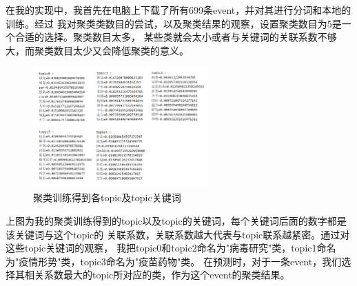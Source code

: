 \documentclass[UTF8]{article}
\begin{document}
在我的实现中，我首先在电脑上下载了所有699条event，并对其进行分词和本地的训练。经过
我对聚类类数目的尝试，以及聚类结果的观察，设置聚类数目为5是一个合适的选择。聚类数目太多，
某些类就会太小或者与关键词的关联系数不够大，而聚类数目太少又会降低聚类的意义。

\begin{figure}[h]
    \label{Ratio}
    \centering
        \includegraphics[width=0.6\textwidth]{cl}
        \caption{聚类训练得到各topic及topic关键词}
    \end{figure}


上图为我的聚类训练得到的topic以及topic的关键词，每个关键词后面的数字都是该关键词与这个topic的
关联系数，关联系数越大代表与topic联系越紧密。通过对这些topic关键词的观察，
我把topic0和topic2命名为"病毒研究"类，topic1命名为"疫情形势"类，topic3命名为"疫苗药物"类。
在预测时，对于一条event，我们选择其相关系数最大的topic所对应的类，作为这个event的聚类结果。
\end{document}
